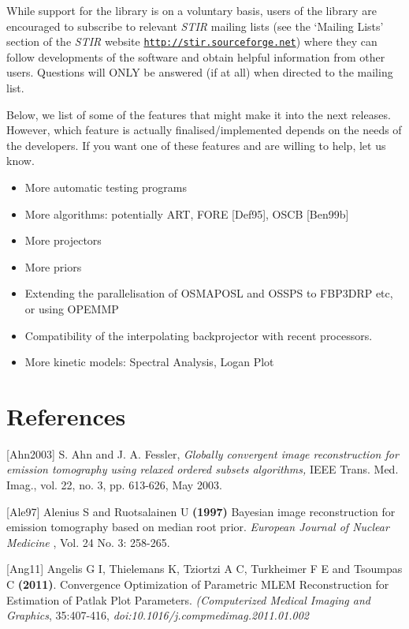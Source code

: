 \documentclass{article}
\def\R2Lurl#1#2{\mbox{\href{#1}{\tt #2}}}
\begin{document}
While support for the library is on a voluntary basis, users 
of the library are encouraged to subscribe to relevant \textit{STIR} 
mailing lists (see the `Mailing Lists' section of the \textit{STIR} website 
\R2Lurl{http://stir.sourceforge.net/ }{http://stir.sourceforge.net}) 
where they can follow developments of the software and obtain 
helpful information from other users. Questions will ONLY be 
answered (if at all) when directed to the mailing list.



Below, we list of some of the features that might make it into the next releases. 
However, which feature is actually finalised/implemented depends 
on the needs of the developers. If you want one of these features 
and are willing to help, let us know.
\begin{itemize}
\item
More automatic testing programs
\item
More algorithms: potentially ART, FORE [Def95], 
OSCB [Ben99b] 
\item
More projectors
\item
More priors
\item
Extending the parallelisation of OSMAPOSL and OSSPS to FBP3DRP etc, or using OPEMMP
\item
Compatibility of the interpolating backprojector with recent 
processors.
\item
More kinetic models: Spectral Analysis, Logan Plot
\end{itemize}





\section{
References}

{[}Ahn2003] S. Ahn and J. A. Fessler, \textit{Globally convergent image reconstruction for
emission tomography using relaxed ordered subsets algorithms,} IEEE
Trans. Med. Imag., vol. 22, no. 3, pp. 613-626, May 2003.

{[}Ale97] Alenius S and Ruotsalainen U \textbf{(1997)} Bayesian image 
reconstruction for emission tomography based on median root prior. \textit{European 
Journal of Nuclear Medicine} , Vol. 24 No. 3: 258-265.

{[}Ang11] Angelis G I, Thielemans K, Tziortzi A C, Turkheimer F E and Tsoumpas C  
\textbf{(2011)}. Convergence Optimization of Parametric MLEM Reconstruction for Estimation of Patlak Plot Parameters.  
\textit{(Computerized Medical Imaging and Graphics}, 35:407-416,  
\textit{doi:10.1016/j.compmedimag.2011.01.002}
\end{document}
